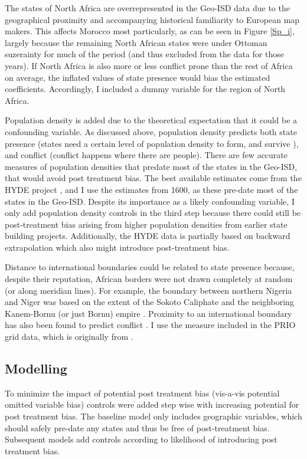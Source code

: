 The states of North Africa are overrepresented in the Geo-ISD data due to the
geographical proximity and accompanying historical familiarity to European map
makers. This affects Morocco most particularly, as can be seen in Figure
\ref{Sp_i}, largely because the remaining North African states were under
Ottoman suzerainty for much of the period (and thus excluded from the data for
those years). If North Africa is also more or less conflict prone than the rest
of Africa on average, the inflated values of state presence would bias the
estimated coefficients. Accordingly, I included a dummy variable for the region
of North Africa.

Population density is added due to the theoretical expectation that it could be
a confounding variable. As discussed above, population density predicts both
state presence (states need a certain level of population density to form, and
survive \citep{scott2017against}), and conflict (conflict happens where there
are people). There are few accurate measures of population densities that
predate most of the states in the Geo-ISD, that would avoid post treatment bias. The
best available estimates come from the HYDE project \citep{Goldewijk2016}, and I
use the estimates from 1600, as these pre-date most of the states in the Geo-ISD.
Despite its importance as a likely confounding variable, I only add population
density controls in the third step because there could still be post-treatment
bias arising from higher population densities from earlier state building projects.
Additionally, the HYDE data is partially based on backward extrapolation which
also might introduce post-treatment bias.

Distance to international boundaries could be related to state presence because,
despite their reputation, African borders were not drawn completely at random
(or along meridian lines). For example, the boundary between northern Nigeria and
Niger was based on the extent of the Sokoto Caliphate and the neighboring
Kanem-Bornu (or just Bornu) empire \citep{HiribarrenVincent2017AHoB}. Proximity
to an international boundary has also been found to predict conflict
\citep{Buhaug2002}. I use the measure included in the PRIO grid data, which is
originally from \citet{Weidmann2010a}.

\subsection{Modelling} \label{Modelling}

To minimize the impact of potential post treatment bias (vis-a-vis potential
omitted variable bias) controls were added step wise with increasing potential
for post treatment bias. The baseline model only includes geographic variables,
which should safely pre-date any states and thus be free of post-treatment bias.
Subsequent models add controls according to likelihood of introducing post
treatment bias.

